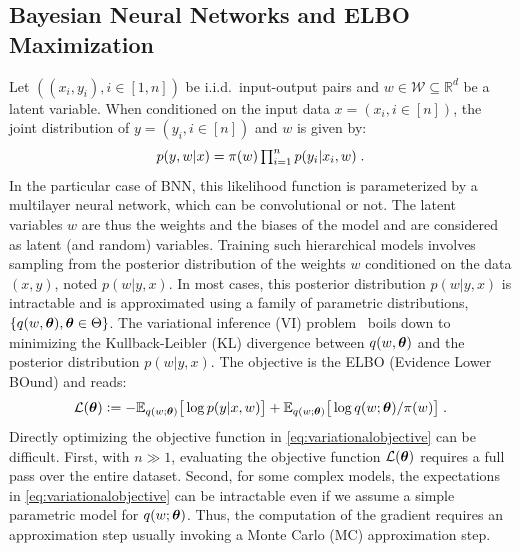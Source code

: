 \documentclass[tablecaption=bottom,wcp]{jmlr}
\begin{document}
\subsection{Bayesian Neural Networks and ELBO Maximization}
Let $((x_i,y_i), i \in [1,n])$ be i.i.d.~input-output pairs and $w \in \mathcal{W} \subseteq \mathbb{R}^{d}$ be a latent variable. 
When conditioned on the input data $x = (x_i, i \in [n])$, the joint distribution of $y = (y_i, i \in [n])$ and $w$ is given by:
\begin{equation}\label{eq:vi} \textstyle
    p(y,w | x) = \prior(w)\prod_{i=1}^{n}{p(y_i | x_i, w)} \eqsp.
\end{equation}
In the particular case of BNN, this likelihood function is parameterized by a multilayer neural network, which can be convolutional or not.
The latent variables $w$ are thus the weights and the biases of the model and are considered as latent (and random) variables.
Training such hierarchical models involves sampling from the posterior distribution of the weights $w$ conditioned on the data $(x,y)$, noted $p(w|y,x)$.
In most cases, this posterior distribution $p(w|y,x)$ is intractable and is approximated using a family of parametric distributions, $\{q(w, \param ), \param \in \Param \}$. 
The variational inference (VI) problem~\citep{blei2017variational} boils down to minimizing the Kullback-Leibler (KL) divergence between $q(w, \param )$ and the posterior distribution $p(w|y,x)$. 
The objective is the ELBO (Evidence Lower BOund) and reads:
\begin{equation}\label{eq:variationalobjective}
{\cal L}(\param) \eqdef -\EE_{ q( w; \param )} \big[\log p(y | x, w) \big]+  \EE_{ q( w; \param )} \big[ \log q(w; \param )/\prior(w) \big]  \eqsp.
\end{equation}
Directly optimizing the objective function in \eqref{eq:variationalobjective} can be difficult.
First, with $n \gg 1$, evaluating the objective function ${\cal L}( \param )$ requires a full pass over the entire dataset.
Second, for some complex models, the expectations in \eqref{eq:variationalobjective} can be intractable even if we assume a simple parametric model for $q(w; \param)$.
Thus, the computation of the gradient requires an approximation step usually invoking a Monte Carlo (MC) approximation step. 
\end{document}
